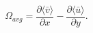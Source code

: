 \begin{equation}
    \Omega_{avg} = \frac{\partial \langle\bar{v}\rangle}{\partial x} - \frac{\partial \langle\bar{u}\rangle}{\partial y}.
    \label{EQN:AveragedDiagnostic}
\end{equation}
